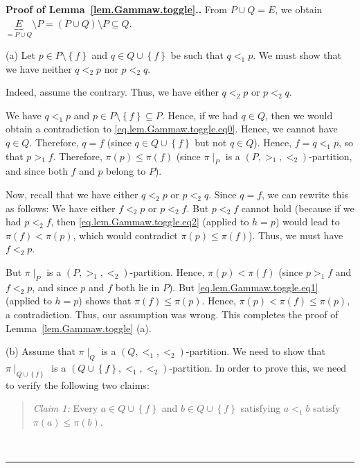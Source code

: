 \documentclass[numbers=enddot,12pt,final,onecolumn,notitlepage,abstracton]{scrartcl}
\theoremstyle{definition}
\newenvironment{statement}{\begin{quote}}{\end{quote}}
\newenvironment{proof}[1][Proof]{\noindent\textbf{#1.} }{\ \rule{0.5em}{0.5em}}
\begin{document}
\begin{proof}[Proof of Lemma~\ref{lem.Gammaw.toggle}.]From
$P \cup Q = E$, we obtain $\underbrace{E}_{= P \cup Q}
\setminus P = \left(P \cup Q\right) \setminus P \subseteq Q$.

(a) Let $p \in P \setminus \left\{f\right\}$
and $q \in Q \cup \left\{f\right\}$ be such that
$q <_1 p$. We must show that we have neither $q <_2 p$ nor $p <_2 q$.

Indeed, assume the contrary. Thus, we have
either $q <_2 p$ or $p <_2 q$.

We have $q <_{1} p$ and
$p\in P\setminus\left\{  f\right\}  \subseteq P$. Hence, if we had $q\in Q$,
then we would obtain a contradiction to
\eqref{eq.lem.Gammaw.toggle.eq0}. Hence, we cannot have $q\in Q$.
Therefore, $q=f$ (since $q\in Q\cup\left\{  f\right\}  $ but not $q\in Q$).
Hence, $f=q<_{1}p$, so that $p>_{1}f$. Therefore, $\pi\left(  p\right)
\leq\pi\left(  f\right)  $ (since $\pi\mid_{P}$ is a
$\left(  P,>_{1},<_{2}\right)  $-partition, and since both $f$
and $p$ belong to $P$).

Now, recall that we have either $q <_2 p$ or $p <_2 q$.
Since $q = f$, we can rewrite this as follows:
We have either $f <_2 p$ or $p <_2 f$.
But $p<_{2}f$ cannot hold (because if we had $p<_{2}f$, then
\eqref{eq.lem.Gammaw.toggle.eq2} (applied to $h=p$) would lead to
$\pi\left(  f\right)  <\pi\left(  p\right)  $, which would contradict
$\pi\left(  p\right)  \leq\pi\left(  f\right)  $).
Thus, we must have $f<_{2}p$.

But $\pi\mid_{P}$ is a $\left(  P,>_{1},<_{2}\right)  $-partition. Hence,
$\pi\left(  p\right)  <\pi\left(  f\right)  $ (since $p>_{1}f$ and $f<_{2}p$,
and since $p$ and $f$ both lie in $P$).
But \eqref{eq.lem.Gammaw.toggle.eq1} (applied to $h=p$) shows that
$\pi\left(  f\right)  \leq\pi\left(  p\right)  $. Hence, $\pi\left(  p\right)
<\pi\left(  f\right)  \leq\pi\left(  p\right)  $, a contradiction. Thus, our
assumption was wrong. This completes the proof of
Lemma~\ref{lem.Gammaw.toggle} (a).

(b) Assume that $\pi \mid_Q$ is a $\left(Q, <_1, <_2\right)$-partition. We need
to show that
$\pi \mid_{Q \cup \left\{f\right\}}$ is a
$\left(Q \cup \left\{f\right\}, <_1, <_2\right)$-partition.
In order
to prove this, we need to verify the following two claims:

\begin{statement}
\textit{Claim 1:} Every $a\in Q\cup\left\{  f\right\}  $ and $b\in
Q\cup\left\{  f\right\}  $ satisfying $a<_{1}b$ satisfy $\pi\left(  a\right)
\leq\pi\left(  b\right)  $.
\end{statement}


\end{proof}
\end{document}
